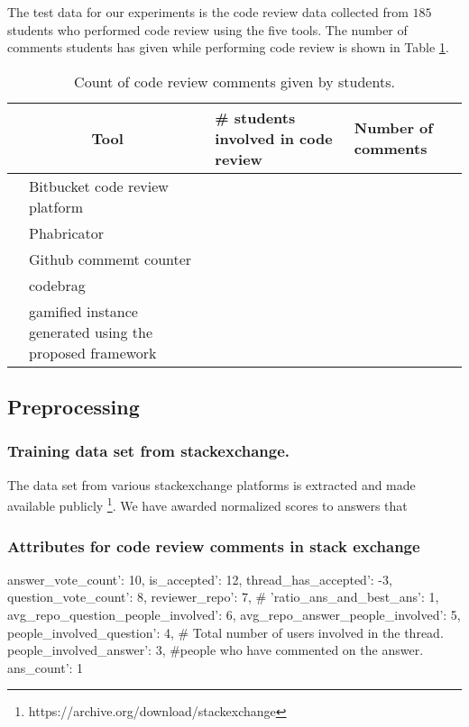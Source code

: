 \documentclass[conference]{IEEEtran}
\newcounter{magicrownumbers}
\newcommand\rownumber{\stepcounter{magicrownumbers}\arabic{magicrownumbers}}
\begin{document}
The test data for our experiments is the code review data collected from $185$ students who performed code review using the five tools. The number of comments students has given while performing code review is shown in Table \ref{tab:commentscount}.

\begin{table}[ht]
\centering
\caption{Count of code review comments given by students.}
\begin{tabular}{|c|p{2.5cm}|p{1.5cm}|p{1.5cm}|} \hline
\multicolumn{2}{|c|}{Tool} & \# students involved in code review & Number of comments   \\ \hline \hline
 \setcounter{magicrownumbers}{0}\rownumber & Bitbucket code review platform & &  \\ 
 \rownumber & Phabricator & &  \\
 \rownumber & Github commemt counter & &  \\
 \rownumber & codebrag & & \\
 \rownumber & gamified instance generated using the proposed framework & &\\
 \hline
\end{tabular}
\label{tab:commentscount}
\end{table}


\subsection{Preprocessing}

\subsubsection{Training data set from stackexchange.}

The data set from various stackexchange platforms is extracted and made available publicly \footnote{https://archive.org/download/stackexchange}. We have awarded normalized scores to answers that 

\subsubsection{Attributes for code review comments in stack exchange} \label{Attributes}

answer_vote_count': 10,
is_accepted': 12, 
thread_has_accepted': -3, 
question_vote_count': 8, 
reviewer_repo': 7,
# 'ratio_ans_and_best_ans': 1,
avg_repo_question_people_involved': 6,
avg_repo_answer_people_involved': 5,
people_involved_question': 4, # Total number of users involved in the thread.
people_involved_answer': 3, #people who have commented on the answer.
ans_count': 1
\end{document}

